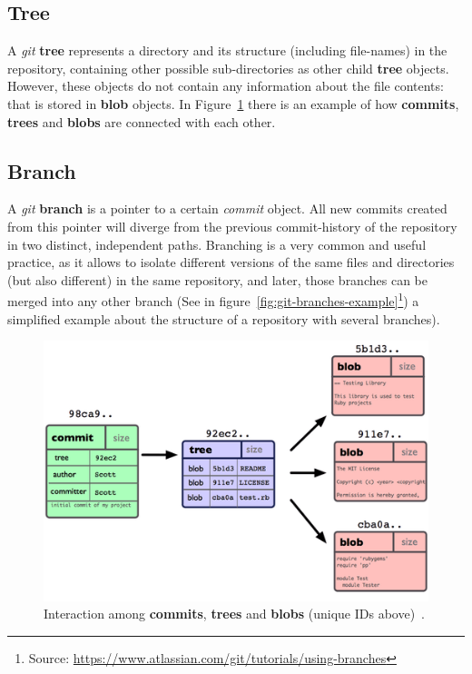 \documentclass[a4paper, 12pt]{book}
\begin{document}
\subsection{Tree}
\label{ssec:git-tree}
A \emph{git} \textbf{tree} represents a directory and its structure (including file-names) in the repository, containing other possible
sub-directories as other child \textbf{tree} objects. However, these objects do not contain any information about the file contents:
that is stored in \textbf{blob} objects. In Figure~\ref{fig:git-objs-example} there is an example of how \textbf{commits},
\textbf{trees} and \textbf{blobs} are connected with each other.
\subsection{Branch}
\label{ssec:git-branch}
A \emph{git} \textbf{branch} is a pointer to a certain \emph{commit} object. All new commits
created from this pointer will diverge from the previous commit-history of the repository in two distinct, independent paths.
Branching is a very common and useful practice, as it allows to isolate different versions of the same files and directories
(but also different) in the same repository, and later, those branches can be merged into any other branch (See in
figure~\ref{fig:git-branches-example}\footnote{Source: \url{https://www.atlassian.com/git/tutorials/using-branches}})
a simplified example about the structure of a repository with several branches).
\begin{figure}
  \centering
  \includegraphics[width=12cm, keepaspectratio]{img/git-objs-example}
  \caption{Interaction among \textbf{commits}, \textbf{trees} and \textbf{blobs} (unique IDs above)~\cite{progit2014book}.}
  \label{fig:git-objs-example}
\end{figure}
\end{document}
